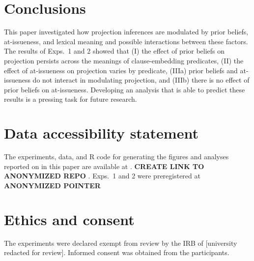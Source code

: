 \documentclass[11pt,fleqn]{article}
\newcommand{\6}{\mbox{$[\hspace*{-.6mm}[$}}
\newcommand{\9}{\mbox{$]\hspace*{-.6mm}]$}}
\begin{document}
\section{Conclusions}\label{s5}

This paper investigated how projection inferences are modulated by prior beliefs, at-issueness, and lexical meaning and possible interactions between these factors. The results of Exps.~1 and 2 showed that (I) the effect of prior beliefs on projection persists across the meanings of clause-embedding predicates, (II) the effect of at-issueness on projection varies by predicate, (IIIa) prior beliefs and at-issueness do not interact in modulating projection, and (IIIb) there is no effect of prior beliefs on at-issueness. Developing an analysis that is able to predict these results is a pressing task for future research.

\newpage

\section*{Data accessibility statement}

The experiments, data, and R code for generating the figures and analyses reported on in this paper are available at 
\url{}. {\bf CREATE LINK TO ANONYMIZED REPO}
.  Exps.~1 and 2 were preregistered at \url{} {\bf ANONYMIZED POINTER}

\section*{Ethics and consent}

The experiments were declared exempt from review by the IRB of [university redacted for review]. Informed consent was obtained from the participants.




%


\end{document}
